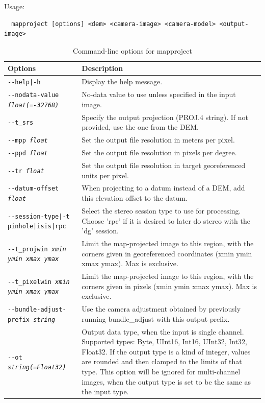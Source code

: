 Usage:
\begin{verbatim}
  mapproject [options] <dem> <camera-image> <camera-model> <output-image>
\end{verbatim}

\begin{longtable}{|l|p{9.5cm}|}
\caption{Command-line options for mapproject}
\label{tbl:mapproject}
\endfirsthead
\endhead
\endfoot
\endlastfoot
\hline
Options & Description \\ \hline \hline
\texttt{-\/-help|-h} & Display the help message. \\ \hline
\texttt{-\/-nodata-value \textit{float(=-32768)}} & No-data value to use unless specified in the input image. \\ \hline
\texttt{-\/-t\_srs} & Specify the output projection (PROJ.4 string). If not provided, use the one from the DEM. \\ \hline
\texttt{-\/-mpp \textit{float}} & Set the output file resolution in meters per pixel. \\ \hline
\texttt{-\/-ppd \textit{float}} & Set the output file resolution in pixels per degree. \\ \hline
\texttt{-\/-tr \textit{float}} & Set the output file resolution in target georeferenced 
units per pixel. \\ \hline
\texttt{-\/-datum-offset \textit{float}} & When projecting to a datum instead of a DEM, add this elevation offset to the datum. \\ \hline
\texttt{-\/-session-type|-t pinhole|isis|rpc} & Select the stereo
session type to use for processing. Choose 'rpc' if it is desired to later do stereo with the 'dg' session. \\ \hline
\texttt{-\/-t\_projwin \textit{xmin ymin xmax ymax}} & Limit the map-projected image to this region, with the corners given in georeferenced coordinates (xmin ymin xmax ymax). Max is exclusive. \\ \hline
\texttt{-\/-t\_pixelwin \textit{xmin ymin xmax ymax}} & Limit the map-projected image to this region, with the corners given in pixels (xmin ymin xmax ymax). Max is exclusive. \\ \hline
\texttt{-\/-bundle-adjust-prefix \textit{string}} & Use the camera
adjustment obtained by previously running bundle\_adjust with this
output prefix. \\ \hline
\texttt{-\/-ot \textit{string(=Float32)}} & Output data type, when the input is single channel. Supported types: Byte, UInt16, Int16, UInt32, Int32, Float32. If the output type is a kind of integer, values are rounded and then clamped to the limits of that type. This option will be ignored for multi-channel images, when the output type is set to be the same as the input type. \\ \hline

\end{longtable}
